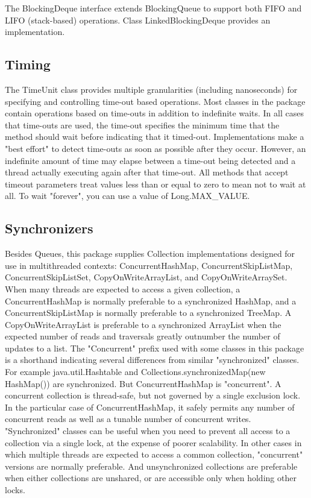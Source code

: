 The BlockingDeque interface extends BlockingQueue to support both FIFO and LIFO (stack-based) operations. Class LinkedBlockingDeque provides an implementation.


\subsection{Timing}
The TimeUnit class provides multiple granularities (including nanoseconds) for specifying and controlling time-out based operations. Most classes in the package contain operations based on time-outs in addition to indefinite waits. In all cases that time-outs are used, the time-out specifies the minimum time that the method should wait before indicating that it timed-out. Implementations make a "best effort" to detect time-outs as soon as possible after they occur. However, an indefinite amount of time may elapse between a time-out being detected and a thread actually executing again after that time-out. All methods that accept timeout parameters treat values less than or equal to zero to mean not to wait at all. To wait "forever", you can use a value of Long.MAX_VALUE.
\subsection{Synchronizers}

Besides Queues, this package supplies Collection implementations designed for use in multithreaded contexts: ConcurrentHashMap, ConcurrentSkipListMap, ConcurrentSkipListSet, CopyOnWriteArrayList, and CopyOnWriteArraySet. When many threads are expected to access a given collection, a ConcurrentHashMap is normally preferable to a synchronized HashMap, and a ConcurrentSkipListMap is normally preferable to a synchronized TreeMap. A CopyOnWriteArrayList is preferable to a synchronized ArrayList when the expected number of reads and traversals greatly outnumber the number of updates to a list.
The "Concurrent" prefix used with some classes in this package is a shorthand indicating several differences from similar "synchronized" classes. For example java.util.Hashtable and Collections.synchronizedMap(new HashMap()) are synchronized. But ConcurrentHashMap is "concurrent". A concurrent collection is thread-safe, but not governed by a single exclusion lock. In the particular case of ConcurrentHashMap, it safely permits any number of concurrent reads as well as a tunable number of concurrent writes. "Synchronized" classes can be useful when you need to prevent all access to a collection via a single lock, at the expense of poorer scalability. In other cases in which multiple threads are expected to access a common collection, "concurrent" versions are normally preferable. And unsynchronized collections are preferable when either collections are unshared, or are accessible only when holding other locks.

